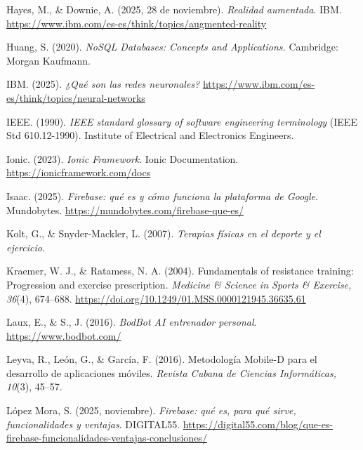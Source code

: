 \begin{referenciasapa}
\item Hayes, M., \& Downie, A. (2025, 28 de noviembre). \textit{Realidad aumentada}. IBM. \url{https://www.ibm.com/es-es/think/topics/augmented-reality}

\item Huang, S. (2020). \textit{NoSQL Databases: Concepts and Applications.} Cambridge: Morgan Kaufmann.

\item IBM. (2025). \textit{¿Qué son las redes neuronales?} \url{https://www.ibm.com/es-es/think/topics/neural-networks}

\item IEEE. (1990). \textit{IEEE standard glossary of software engineering terminology} (IEEE Std 610.12-1990). Institute of Electrical and Electronics Engineers.

\item Ionic. (2023). \textit{Ionic Framework}. Ionic Documentation. \url{https://ionicframework.com/docs}

\item Isaac. (2025). \textit{Firebase: qué es y cómo funciona la plataforma de Google}. Mundobytes. \url{https://mundobytes.com/firebase-que-es/}

\item Kolt, G., \& Snyder-Mackler, L. (2007). \textit{Terapias físicas en el deporte y el ejercicio}.

\item Kraemer, W. J., \& Ratamess, N. A. (2004). Fundamentals of resistance training: Progression and exercise prescription. \textit{Medicine \& Science in Sports \& Exercise, 36}(4), 674--688. \url{https://doi.org/10.1249/01.MSS.0000121945.36635.61}

\item Laux, E., \& S., J. (2016). \textit{BodBot AI entrenador personal}. \url{https://www.bodbot.com/}

\item Leyva, R., León, G., \& García, F. (2016). Metodología Mobile-D para el desarrollo de aplicaciones móviles. \textit{Revista Cubana de Ciencias Informáticas, 10}(3), 45--57.

\item López Mora, S. (2025, noviembre). \textit{Firebase: qué es, para qué sirve, funcionalidades y ventajas}. DIGITAL55. \url{https://digital55.com/blog/que-es-firebase-funcionalidades-ventajas-conclusiones/}


\end{referenciasapa}
